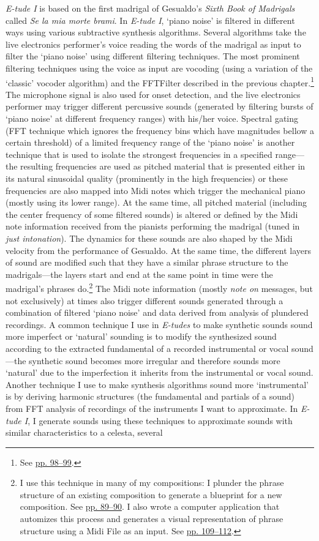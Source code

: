 \emph{E-tude I} is based on the first madrigal of Gesualdo's \emph{Sixth Book of Madrigals} called \emph{Se la mia morte brami}. In \emph{E-tude I}, `piano noise' is filtered in different ways using various subtractive synthesis algorithms. Several algorithms take the live electronics performer's voice reading the words of the madrigal as input to filter the `piano noise' using different filtering techniques. The most prominent filtering techniques using the voice as input are vocoding (using a variation of the `classic' vocoder algorithm) and the FFTFilter described in the previous chapter.\footnote{See \hyperlink{fftfilter}{pp. 98--99}.} The microphone signal is also used for onset detection, and the live electronics performer may trigger different percussive sounds (generated by filtering bursts of `piano noise' at different frequency ranges) with his/her voice.  Spectral gating (FFT technique which ignores the frequency bins which have magnitudes bellow a certain threshold) of a limited frequency range of the `piano noise' is another technique that is used to isolate the strongest frequencies in a specified range---the resulting frequencies are used as pitched material that is presented either in its natural sinusoidal quality (prominently in the high frequencies) or these frequencies are also mapped into Midi notes which trigger the mechanical piano (mostly using its lower range). At the same time, all pitched material (including the center frequency of some filtered sounds) is altered or defined by the Midi note information received from the pianists performing the madrigal (tuned in \emph{just intonation}). The dynamics for these sounds are also shaped by the Midi velocity from the performance of Gesualdo. At the same time, the different layers of sound are modified such that they have a similar phrase structure to the madrigals---the layers start and end at the same point in time were the madrigal's phrases do.\footnote{I use this technique in many of my compositions: I plunder the phrase structure of an existing composition to generate a blueprint for a new composition. See \hyperlink{macroplunder}{pp. 89--90}. I also wrote a computer application that automizes this process and generates a visual representation of phrase structure using a Midi File as an input. See \hyperlink{scorevisual}{pp. 109--112}.} The Midi note information (mostly \emph{note on} messages, but not exclusively) at times also trigger different sounds generated through a combination of filtered `piano noise' and data derived from analysis of plundered recordings. A common technique I use in \emph{E-tudes} to make synthetic sounds sound more imperfect or `natural' sounding is to modify the synthesized sound according to the extracted fundamental of a recorded instrumental or vocal sound---the synthetic sound becomes more irregular and therefore sounds more `natural' due to the imperfection it inherits from the instrumental or vocal sound. Another technique I use to make synthesis algorithms sound more `instrumental' is by deriving harmonic structures (the fundamental and partials of a sound) from FFT analysis of recordings of the instruments I want to approximate. In \emph{E-tude I}, I generate sounds using these techniques to approximate sounds with similar characteristics to a celesta, several 